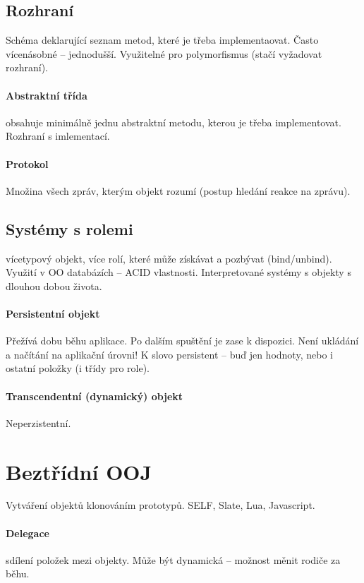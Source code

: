 \documentclass[a4paper, 11pt]{report}
\begin{document}
\subsection{Rozhraní}

Schéma deklarující seznam metod, které je třeba implementaovat. Často vícenásobné -- jednodušší. Využitelné pro polymorfismus (stačí vyžadovat rozhraní).

\paragraph{Abstraktní třída}
obsahuje minimálně jednu abstraktní metodu, kterou je třeba implementovat. Rozhraní s imlementací.

\paragraph{Protokol}
Množina všech zpráv, kterým objekt rozumí (postup hledání reakce na zprávu).

\subsection{Systémy s rolemi}
vícetypový objekt, více rolí, které může získávat a pozbývat (bind/unbind). Využití v OO databázích -- ACID vlastnosti. Interpretované systémy s objekty s dlouhou dobou života.

\paragraph{Persistentní objekt}
Přežívá dobu běhu aplikace. Po dalším spuštění je zase k dispozici. Není ukládání a načítání na aplikační úrovni! K slovo persistent -- buď jen hodnoty, nebo i ostatní položky (i třídy pro role). 

\paragraph{Transcendentní (dynamický) objekt}
Neperzistentní.

\section{Beztřídní OOJ}

Vytváření objektů klonováním prototypů. SELF, Slate, Lua, Javascript.

\paragraph{Delegace} sdílení položek mezi objekty. Může být dynamická -- možnost měnit rodiče za běhu.
\end{document}

